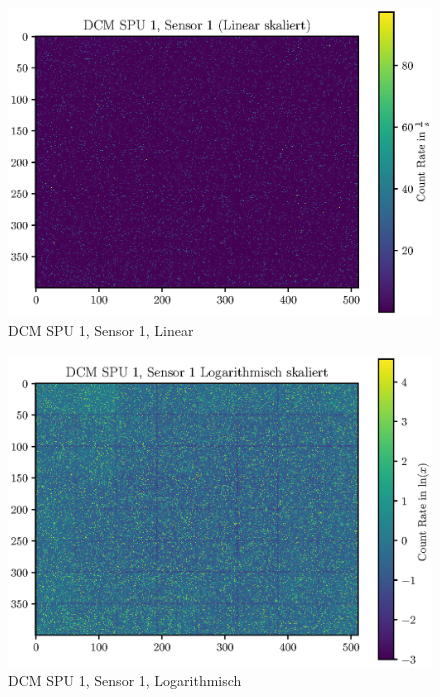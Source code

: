 \documentclass[12pt,twoside,a4paper]{scrartcl}
\begin{document}
			\begin{figure}[H]
				\includegraphics[width = \textwidth]{Plots/DCM/DCM_SPU1_Sensor1_lin.eps}
				\caption{DCM SPU 1, Sensor 1, Linear}
			\end{figure}

			\begin{figure}[H]
				\includegraphics[width = \textwidth]{Plots/DCM/DCM_SPU1_Sensor1_log.eps}
				\caption{DCM SPU 1, Sensor 1, Logarithmisch}
			\end{figure}
\end{document}
